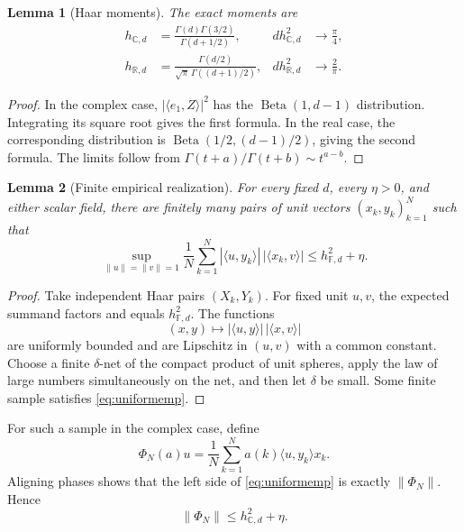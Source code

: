 \documentclass[11pt]{article}
\newtheorem{lemma}{Lemma}
\newcommand{\C}{\mathbb C}
\newcommand{\R}{\mathbb R}
\begin{document}
\begin{lemma}[Haar moments]\label{lem:moments}
The exact moments are
\begin{align}
 h_{\C,d}&=\frac{\Gamma(d)\Gamma(3/2)}{\Gamma(d+1/2)},
 & d h_{\C,d}^2&\longrightarrow\frac\pi4,\label{eq:cmoment}\\
 h_{\R,d}&=\frac{\Gamma(d/2)}{\sqrt\pi\,\Gamma((d+1)/2)},
 & d h_{\R,d}^2&\longrightarrow\frac2\pi.\label{eq:rmoment}
\end{align}
\end{lemma}

\begin{proof}
In the complex case, $|\langle e_1,Z\rangle|^2$ has the
$\operatorname{Beta}(1,d-1)$ distribution.  Integrating its square root gives
the first formula.  In the real case, the corresponding distribution is
$\operatorname{Beta}(1/2,(d-1)/2)$, giving the second formula.  The limits
follow from $\Gamma(t+a)/\Gamma(t+b)\sim t^{a-b}$.
\end{proof}

\begin{lemma}[Finite empirical realization]\label{lem:empirical}
For every fixed $d$, every $\eta>0$, and either scalar field, there are
finitely many pairs of unit vectors $(x_k,y_k)_{k=1}^N$ such that
\begin{equation}\label{eq:uniformemp}
 \sup_{\|u\|=\|v\|=1}
 \frac1N\sum_{k=1}^N
 |\langle u,y_k\rangle|\,|\langle x_k,v\rangle|
 \leq h_{\mathbb F,d}^2+\eta.
\end{equation}
\end{lemma}

\begin{proof}
Take independent Haar pairs $(X_k,Y_k)$.  For fixed unit $u,v$, the expected
summand factors and equals $h_{\mathbb F,d}^2$.  The functions
\[
 (x,y)\longmapsto |\langle u,y\rangle|\,|\langle x,v\rangle|
\]
are uniformly bounded and are Lipschitz in $(u,v)$ with a common constant.
Choose a finite $\delta$-net of the compact product of unit spheres, apply the
law of large numbers simultaneously on the net, and then let $\delta$ be
small.  Some finite sample satisfies \eqref{eq:uniformemp}.
\end{proof}

For such a sample in the complex case, define
\begin{equation}\label{eq:samplemap}
 \Phi_N(a)u=\frac1N\sum_{k=1}^N
 a(k)\langle u,y_k\rangle x_k.
\end{equation}
Aligning phases shows that the left side of \eqref{eq:uniformemp} is exactly
$\|\Phi_N\|$.  Hence
\begin{equation}\label{eq:sampleordinary}
 \|\Phi_N\|\leq h_{\C,d}^2+\eta.
\end{equation}
\end{document}
